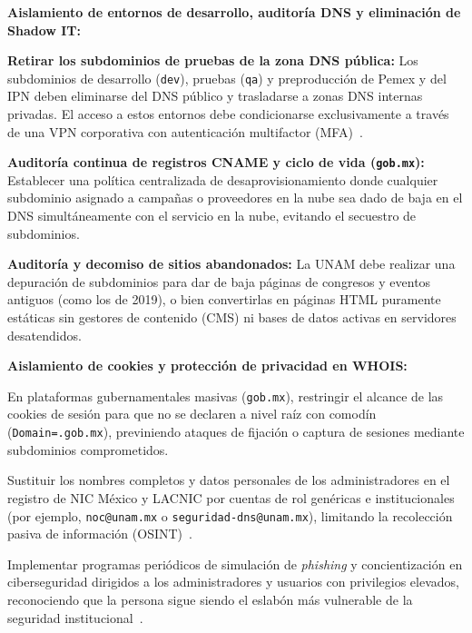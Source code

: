 \begin{enumerateColor}
    \item \textbf{Aislamiento de entornos de desarrollo, auditoría DNS y eliminación de Shadow IT:}
    \begin{itemizeColor}
        \item \textbf{Retirar los subdominios de pruebas de la zona DNS pública:} Los subdominios de desarrollo (\texttt{dev}), pruebas (\texttt{qa}) y preproducción de Pemex y del IPN deben eliminarse del DNS público y trasladarse a zonas DNS internas privadas. El acceso a estos entornos debe condicionarse exclusivamente a través de una VPN corporativa con autenticación multifactor (MFA)~\cite{cisa_cyber_hygiene, nist_sp800_63b}.
        \item \textbf{Auditoría continua de registros CNAME y ciclo de vida (\texttt{gob.mx}):} Establecer una política centralizada de desaprovisionamiento donde cualquier subdominio asignado a campañas o proveedores en la nube sea dado de baja en el DNS simultáneamente con el servicio en la nube, evitando el secuestro de subdominios.
        \item \textbf{Auditoría y decomiso de sitios abandonados:} La UNAM debe realizar una depuración de subdominios para dar de baja páginas de congresos y eventos antiguos (como los de 2019), o bien convertirlas en páginas HTML puramente estáticas sin gestores de contenido (CMS) ni bases de datos activas en servidores desatendidos.
    \end{itemizeColor}

    \item \textbf{Aislamiento de cookies y protección de privacidad en WHOIS:}
    \begin{itemizeColor}
        \item En plataformas gubernamentales masivas (\texttt{gob.mx}), restringir el alcance de las cookies de sesión para que no se declaren a nivel raíz con comodín (\texttt{Domain=.gob.mx}), previniendo ataques de fijación o captura de sesiones mediante subdominios comprometidos.
        \item Sustituir los nombres completos y datos personales de los administradores en el registro de NIC México y LACNIC por cuentas de rol genéricas e institucionales (por ejemplo, \texttt{noc@unam.mx} o \texttt{seguridad-dns@unam.mx}), limitando la recolección pasiva de información (OSINT)~\cite{bazzell_osint}.
        \item Implementar programas periódicos de simulación de \textit{phishing} y concientización en ciberseguridad dirigidos a los administradores y usuarios con privilegios elevados, reconociendo que la persona sigue siendo el eslabón más vulnerable de la seguridad institucional~\cite{mitnick_art_of_deception}.
    \end{itemizeColor}
\end{enumerateColor}

